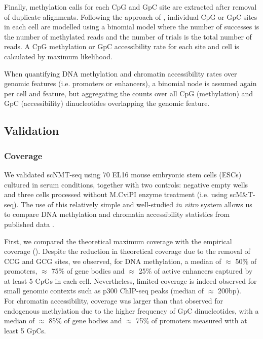 Finally, methylation calls for each CpG and GpC site are extracted after removal of duplicate alignments. Following the approach of \cite{Smallwood2014}, individual CpG or GpC sites in each cell are modelled using a binomial model where the number of successes is the number of methylated reads and the number of trials is the total number of reads. A CpG methylation or GpC accessibility rate for each site and cell is calculated by maximum likelihood.

When quantifying DNA methylation and chromatin accessibility rates over genomic features (i.e. promoters or enhancers), a binomial node is assumed again per cell and feature, but aggregating the counts over all CpG (methylation) and GpC (accessibility) dinucleotides overlapping the genomic feature.

\subsection{Validation}

\subsubsection{Coverage} \label{section:scnmt_coverage}
We validated scNMT-seq using 70 EL16 mouse embryonic stem cells (ESCs) cultured in serum conditions, together with two controls: negative empty wells and three cells processed without M.CviPI enzyme treatment (i.e. using scM\&T-seq). The use of this relatively simple and well-studied \textit{in vitro} system allows us to compare DNA methylation and chromatin accessibility statistics from published data \cite{Smallwood2014,Angermueller2016,Ficz2013}.

First, we compared the theoretical maximum coverage with the empirical coverage (). Despite the reduction in theoretical coverage due to the removal of CCG and GCG sites, we observed, for DNA methylation, a median of $\approx$ 50\% of promoters, $\approx$ 75\% of gene bodies and $\approx$ 25\% of active enhancers captured by at least 5 CpGs in each cell. Nevertheless, limited coverage is indeed observed for small genomic contexts such as p300 ChIP-seq peaks (median of $\approx$ 200bp).\\
For chromatin accessibility, coverage was larger than that observed for endogenous methylation due to the higher frequency of GpC dinucleotides, with a median of $\approx$ 85\% of gene bodies and $\approx$ 75\% of promoters measured with at least 5 GpCs.

